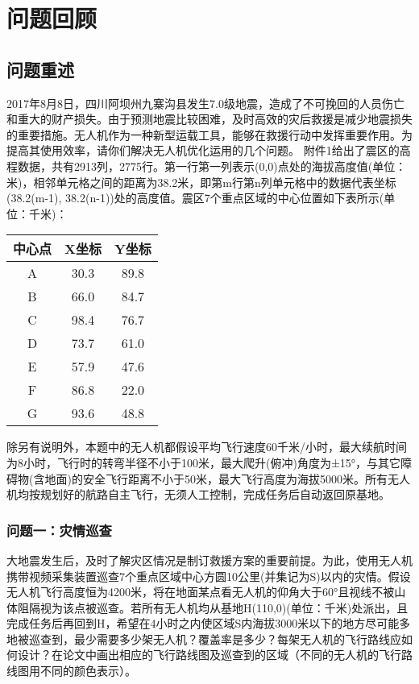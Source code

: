 \chapter{问题回顾}
\label{cha:question}

\section{问题重述}
2017年8月8日，四川阿坝州九寨沟县发生7.0级地震，造成了不可挽回的人员伤亡和重大的财产损失。由于预测地震比较困难，及时高效的灾后救援是减少地震损失的重要措施。无人机作为一种新型运载工具，能够在救援行动中发挥重要作用。为提高其使用效率，请你们解决无人机优化运用的几个问题。
附件1给出了震区的高程数据，共有2913列，2775行。第一行第一列表示(0,0)点处的海拔高度值(单位：米)，相邻单元格之间的距离为38.2米，即第m行第n列单元格中的数据代表坐标(38.2(m-1), 38.2(n-1))处的高度值。震区7个重点区域的中心位置如下表所示(单位：千米)：
\begin{table}
\centering
\begin{tabular}{|c|c|c|}
\hline
中心点&X坐标&Y坐标\\
\hline
A&30.3&89.8\\
\hline
B&66.0&84.7\\
\hline
C&98.4&76.7\\
\hline
D&73.7&61.0\\
\hline
E&57.9&47.6\\
\hline
F&86.8&22.0\\
\hline
G&93.6&48.8\\
\hline
\end{tabular}
\end{table}
除另有说明外，本题中的无人机都假设平均飞行速度60千米/小时，最大续航时间为8小时，飞行时的转弯半径不小于100米，最大爬升(俯冲)角度为±15°，与其它障碍物(含地面)的安全飞行距离不小于50米，最大飞行高度为海拔5000米。所有无人机均按规划好的航路自主飞行，无须人工控制，完成任务后自动返回原基地。
\subsection{问题一：灾情巡查}
大地震发生后，及时了解灾区情况是制订救援方案的重要前提。为此，使用无人机携带视频采集装置巡查7个重点区域中心方圆10公里(并集记为S)以内的灾情。假设无人机飞行高度恒为4200米，将在地面某点看无人机的仰角大于60°且视线不被山体阻隔视为该点被巡查。若所有无人机均从基地H(110,0)(单位：千米)处派出，且完成任务后再回到H，希望在4小时之内使区域S内海拔3000米以下的地方尽可能多地被巡查到，最少需要多少架无人机？覆盖率是多少？每架无人机的飞行路线应如何设计？在论文中画出相应的飞行路线图及巡查到的区域（不同的无人机的飞行路线图用不同的颜色表示）。

